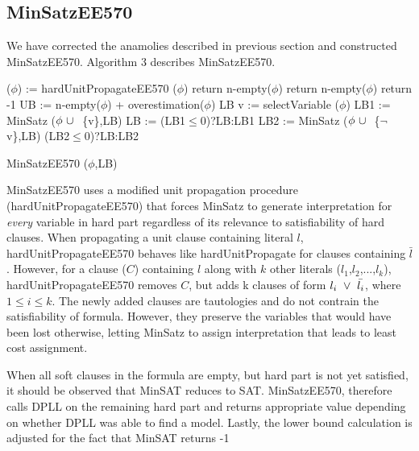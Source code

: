 \subsection {MinSatzEE570}
We have corrected the anamolies described in previous section and constructed
MinSatzEE570. Algorithm 3 describes MinSatzEE570.
\begin{algorithm}
 \SetAlgoLined 
 ($\phi$) := hardUnitPropagateEE570 ($\phi$)\;
  {return n-empty($\phi$)}
  {
      {return n-empty($\phi$)}
      {return -1}
 }
 UB := n-empty($\phi$) + overestimation($\phi$)\;
  {\Return LB}
 v := selectVariable ($\phi$)\;
 LB1 := MinSatz ($\phi ~\cup~ $ \{v\},LB)\;
 LB  := (LB1$\le$0)?LB:LB1\;
 LB2 := MinSatz ($\phi ~\cup~ $ \{$\neg$v\},LB)\;
  {\Return (LB2$\le$0)?LB:LB2}
 \caption{MinSatzEE570 ($\phi$,LB)}
\end{algorithm}
MinSatzEE570 uses a modified unit propagation procedure
(hardUnitPropagateEE570) that forces MinSatz to generate interpretation for
\emph{every} variable in hard part regardless of its relevance to satisfiability
of hard clauses. When propagating a unit clause containing literal $l$,
hardUnitPropagateEE570 behaves like hardUnitPropagate for clauses containing
$\bar{l}$. However, for a clause ($C$) containing $l$ along with $k$ other
literals ($l_1$,$l_2$,...,$l_k$), hardUnitPropagateEE570 removes $C$, but adds
k clauses of form $l_i ~\vee~ \bar{l_i}$, where $1\le i \le k$. The newly added
clauses are tautologies and do not contrain the satisfiability of formula.
However, they preserve the variables that would have been lost otherwise,
letting MinSatz to assign interpretation that leads to least cost assignment.

When all soft clauses in the formula are empty, but hard part is not yet
satisfied, it should be observed that MinSAT reduces to SAT. MinSatzEE570,
therefore calls DPLL on the remaining hard part and returns appropriate value
depending on whether DPLL was able to find a model. Lastly, the lower bound
calculation is adjusted for the fact that MinSAT returns -1

